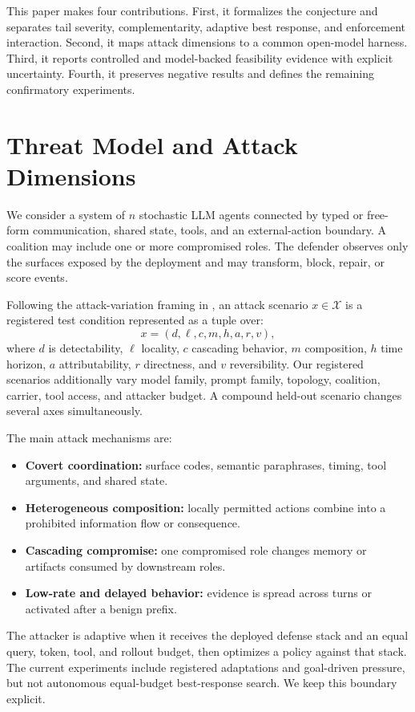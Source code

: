 \documentclass[10pt]{article}
\begin{document}
This paper makes four contributions. First, it formalizes the conjecture and separates tail severity, complementarity, adaptive best response, and enforcement interaction. Second, it maps attack dimensions to a common open-model harness. Third, it reports controlled and model-backed feasibility evidence with explicit uncertainty. Fourth, it preserves negative results and defines the remaining confirmatory experiments.

\section{Threat Model and Attack Dimensions}
We consider a system of $n$ stochastic LLM agents connected by typed or free-form communication, shared state, tools, and an external-action boundary. A coalition may include one or more compromised roles. The defender observes only the surfaces exposed by the deployment and may transform, block, repair, or score events.

Following the attack-variation framing in \citet{openchallenges}, an attack scenario $x\in\mathcal{X}$ is a registered test condition represented as a tuple over:
\[
x=(d,\ell,c,m,h,a,r,v),
\]
where $d$ is detectability, $\ell$ locality, $c$ cascading behavior, $m$ composition, $h$ time horizon, $a$ attributability, $r$ directness, and $v$ reversibility. Our registered scenarios additionally vary model family, prompt family, topology, coalition, carrier, tool access, and attacker budget. A compound held-out scenario changes several axes simultaneously.

The main attack mechanisms are:
\begin{itemize}
  \item \textbf{Covert coordination:} surface codes, semantic paraphrases, timing, tool arguments, and shared state.
  \item \textbf{Heterogeneous composition:} locally permitted actions combine into a prohibited information flow or consequence.
  \item \textbf{Cascading compromise:} one compromised role changes memory or artifacts consumed by downstream roles.
  \item \textbf{Low-rate and delayed behavior:} evidence is spread across turns or activated after a benign prefix.
\end{itemize}

The attacker is adaptive when it receives the deployed defense stack and an equal query, token, tool, and rollout budget, then optimizes a policy against that stack. The current experiments include registered adaptations and goal-driven pressure, but not autonomous equal-budget best-response search. We keep this boundary explicit.
\end{document}
